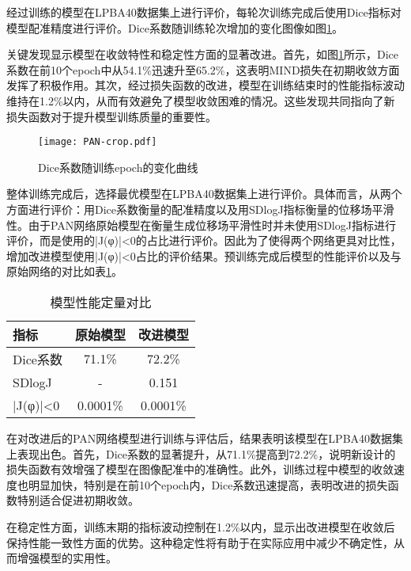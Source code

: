 经过训练的模型在LPBA40数据集上进行评价，每轮次训练完成后使用Dice指标对模型配准精度进行评价。Dice系数随训练轮次增加的变化图像如图\ref{fig:PANDice}。

关键发现显示模型在收敛特性和稳定性方面的显著改进。首先，如图\ref{fig:PANDice}所示，Dice系数在前10个epoch中从54.1\%迅速升至65.2\%，这表明MIND损失在初期收敛方面发挥了积极作用。其次，经过损失函数的改进，模型在训练结束时的性能指标波动维持在1.2\%以内，从而有效避免了模型收敛困难的情况。这些发现共同指向了新损失函数对于提升模型训练质量的重要性。

\begin{figure}[h]
    \centering
    \texttt{[image: PAN-crop.pdf]}
    \caption{Dice系数随训练epoch的变化曲线}
    \label{fig:PANDice}
\end{figure}

整体训练完成后，选择最优模型在LPBA40数据集上进行评价。具体而言，从两个方面进行评价：用Dice系数衡量的配准精度以及用SDlogJ指标衡量的位移场平滑性。由于PAN网络原始模型在衡量生成位移场平滑性时并未使用SDlogJ指标进行评价，而是使用的|J(φ)|<0的占比进行评价。因此为了使得两个网络更具对比性，增加改进模型使用|J(φ)|<0占比的评价结果。预训练完成后模型的性能评价以及与原始网络的对比如表\ref{tab:PANresult}。

\begin{table}[h]
    \centering
    \caption{模型性能定量对比}
    \label{tab:PANresult}
    \begin{tabular}{lcc}
        \toprule
        \textbf{指标} & \textbf{原始模型} & \textbf{改进模型} \\
        \midrule
        Dice系数      & 71.1\%        & 72.2\%        \\
        SDlogJ      & -             & 0.151         \\
        |J(φ)|<0    & 0.0001\%      & 0.0001\%      \\
        \bottomrule
    \end{tabular}
\end{table}

在对改进后的PAN网络模型进行训练与评估后，结果表明该模型在LPBA40数据集上表现出色。首先，Dice系数的显著提升，从71.1\%提高到72.2\%，说明新设计的损失函数有效增强了模型在图像配准中的准确性。此外，训练过程中模型的收敛速度也明显加快，特别是在前10个epoch内，Dice系数迅速提高，表明改进的损失函数特别适合促进初期收敛。

在稳定性方面，训练末期的指标波动控制在1.2\%以内，显示出改进模型在收敛后保持性能一致性方面的优势。这种稳定性将有助于在实际应用中减少不确定性，从而增强模型的实用性。

